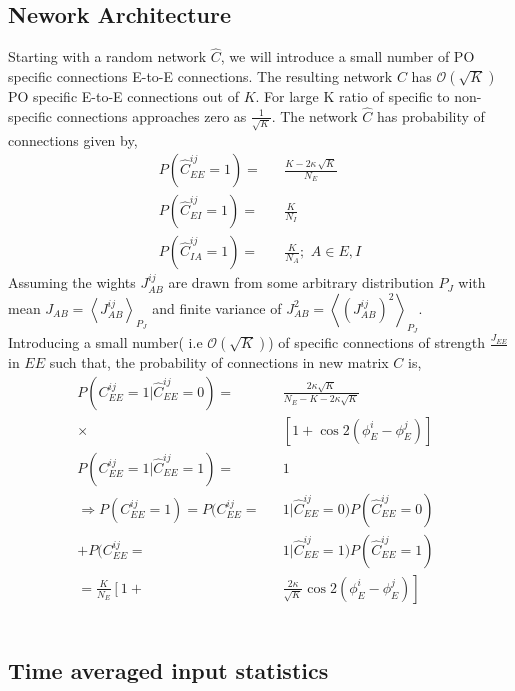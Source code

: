 \subsection{Nework Architecture}
Starting with a random network $\hat{C}$, we will introduce a small number of PO specific connections E-to-E connections. The resulting network $C$ has $\mathcal{O}(\sqrt{K})$ PO specific E-to-E connections out of $K$. For large K ratio of specific to non-specific connections approaches zero as $\frac{1}{\sqrt{K}}$. The network $\hat{C} $ has probability of connections given by, 
\begin{eqnarray}
P(\hat{C}_{EE}^{ij} = 1) =&& \frac{K - 2 \kappa \, \sqrt{K}}{N_E}  \\
P(\hat{C}_{EI}^{ij} = 1) =&& \frac{K}{N_I} \\
P(\hat{C}_{IA}^{ij} = 1) =&& \frac{K}{N_A}; \,\, A \in {E, I} 
\end{eqnarray}
Assuming the wights $J_{AB}^{ij}$ are drawn from some arbitrary distribution $P_J$ with mean $J_{AB} = \left\langle J_{AB}^{ij} \right\rangle_{P_J}$ and finite variance of $J^2_{AB} = \left\langle \left( J_{AB}^{ij} \right)^2 \right\rangle_{P_J}$. \\
Introducing a small number( i.e $ \mathcal{O} \left( \sqrt{K} \right)$) of specific connections of strength $\frac{J_{EE}}{}$ in $EE$ such that, the probability of connections in new matrix $C$ is,
\begin{eqnarray}
P(C_{EE}^{ij} = 1 | \hat{C}_{EE}^{ij} = 0) =&&  \frac{2 \kappa  \sqrt{K}    }{N_E - K - 2 \kappa  \sqrt{K} } \nonumber \\
\times&& \left[ 1 + \cos2(\phi_E^i - \phi_E^j) \right] \,\,\,\, \\
P(C_{EE}^{ij} = 1 | \hat{C}_{EE}^{ij} = 1) =&& 1  \\
\Rightarrow P(C_{EE}^{ij} = 1) = P(C_{EE}^{ij} =&& 1 | \hat{C}_{EE}^{ij} = 0) P(\hat{C}_{EE}^{ij} = 0) \nonumber \\
+ P(C_{EE}^{ij} =&& 1 | \hat{C}_{EE}^{ij} = 1) P(\hat{C}_{EE}^{ij} = 1) \nonumber  \\
= \frac{K}{N_E} \left[1 + \right.&&  \left. \frac{2 \kappa }{\sqrt{K}} \cos 2(\phi_E^i - \phi_E^j) \right]
\end{eqnarray}\\

\subsection{Time averaged input statistics}

